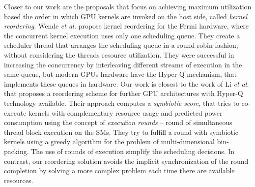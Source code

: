 \documentclass[conference]{IEEEtran}
\begin{document}
Closer to our work are the proposals that focus on achieving maximum utilization based the order in which GPU kernels are invoked on the host side, called \textit{kernel reordering}. Wende \textit{et al.} \cite{wende2012improving} propose kernel reordering for the Fermi hardware, where the concurrent kernel execution uses only one scheduling queue. They create a scheduler thread that arranges the scheduling queue in a round-robin fashion, without considering the threads resource utilization. They were successful in increasing the concurrency by interleaving different streams of execution in the same queue, but modern GPUs hardware have the Hyper-Q mechanism, that implements these queues in hardware. Our work is closest to the work of Li \textit{et al.} \cite{li2015power} that proposes a reordering scheme for further GPU architectures with Hyper-Q technology available. Their approach computes a \textit{symbiotic score}, that tries to co-execute kernels with complementary resource usage and predicted power consumption using the concept of \textit{execution rounds} -- round of simultaneous thread block execution on the SMs. They try to fulfill a round with symbiotic kernels using a greedy algorithm for the problem of multi-dimensional bin-packing. The use of rounds of execution simplify the scheduling decisions. In contrast, our reordering solution avoids the implicit synchronization of the round completion by solving a more complex problem each time there are available resources. 

 

\end{document}
